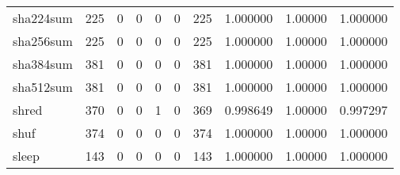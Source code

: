 \begin{tabular}{lrrrrrrrrr}
sha224sum &                    225 &                                  0 &                                 0 &                                0 &                                 0 &                             225 &                                1.000000 &                                1.00000 &                             1.000000 \\
sha256sum &                    225 &                                  0 &                                 0 &                                0 &                                 0 &                             225 &                                1.000000 &                                1.00000 &                             1.000000 \\
sha384sum &                    381 &                                  0 &                                 0 &                                0 &                                 0 &                             381 &                                1.000000 &                                1.00000 &                             1.000000 \\
sha512sum &                    381 &                                  0 &                                 0 &                                0 &                                 0 &                             381 &                                1.000000 &                                1.00000 &                             1.000000 \\
shred     &                    370 &                                  0 &                                 0 &                                1 &                                 0 &                             369 &                                0.998649 &                                1.00000 &                             0.997297 \\
shuf      &                    374 &                                  0 &                                 0 &                                0 &                                 0 &                             374 &                                1.000000 &                                1.00000 &                             1.000000 \\
sleep     &                    143 &                                  0 &                                 0 &                                0 &                                 0 &                             143 &                                1.000000 &                                1.00000 &                             1.000000 \\

\end{tabular}
